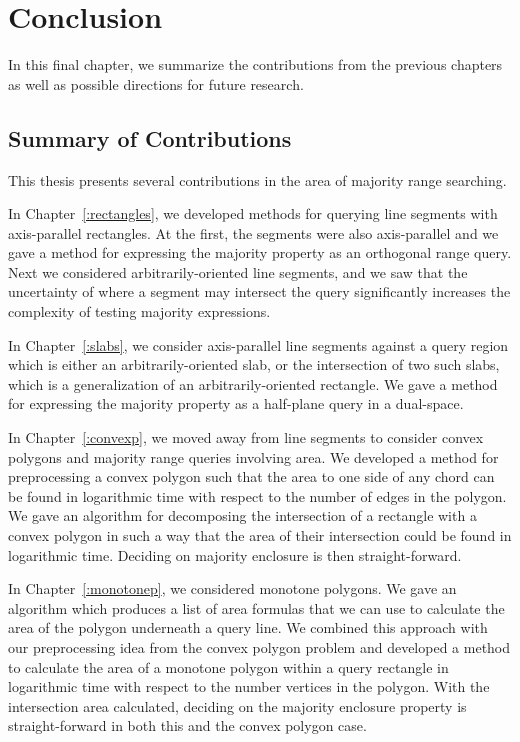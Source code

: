 \chapter{Conclusion}
\label{:conclusion}

In this final chapter, we summarize the contributions from the previous chapters as well as possible directions for future research.

\section{Summary of Contributions}
\label{:conclusion:contributions}

This thesis presents several contributions in the area of majority range searching.

In Chapter~\ref{:rectangles}, we developed methods for querying line segments with axis-parallel rectangles. 
At the first, the segments were also axis-parallel and we gave a method for expressing the majority property as an orthogonal range query. 
Next we considered arbitrarily-oriented line segments, and we saw that the uncertainty of where a segment may intersect the query significantly increases the complexity of testing majority expressions.

In Chapter~\ref{:slabs}, we consider axis-parallel line segments against a query region which is either an arbitrarily-oriented slab, or the intersection of two such slabs, which is a generalization of an arbitrarily-oriented rectangle. We gave a method for expressing the majority property as a half-plane query in a dual-space.

In Chapter~\ref{:convexp}, we moved away from line segments to consider convex polygons and majority range queries involving area. 
We developed a method for preprocessing a convex polygon such that the area to one side of any chord can be found in logarithmic time with respect to the number of edges in the polygon. 
We gave an algorithm for decomposing the intersection of a rectangle with a convex polygon in such a way that the area of their intersection could be found in logarithmic time. 
Deciding on majority enclosure is then straight-forward.

In Chapter~\ref{:monotonep}, we considered monotone polygons. 
We gave an algorithm which produces a list of area formulas that we can use to calculate the area of the polygon underneath a query line.
We combined this approach with our preprocessing idea from the convex polygon problem and developed a method to calculate the area of a monotone polygon within a query rectangle in logarithmic time with respect to the number vertices in the polygon. 
With the intersection area calculated, deciding on the majority enclosure property is straight-forward in both this and the convex polygon case.


